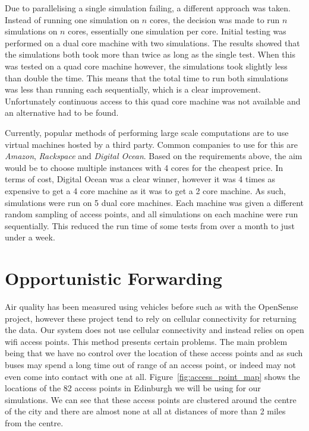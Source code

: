            Due to parallelising a single simulation failing, a different approach was taken. Instead of running one simulation on $n$ cores, the decision was made to run $n$ simulations on $n$ cores, essentially one simulation per core. Initial testing was performed on a dual core machine with two simulations. The results showed that the simulations both took more than twice as long as the single test. When this was tested on a quad core machine however, the simulations took slightly less than double the time. This means that the total time to run both simulations was less than running each sequentially, which is a clear improvement. Unfortunately continuous access to this quad core machine was not available and an alternative had to be found. 

            Currently, popular methods of performing large scale computations are to use virtual machines hosted by a third party. Common companies to use for this are \emph{Amazon}, \emph{Rackspace} and \emph{Digital Ocean}. Based on the requirements above, the aim would be to choose multiple instances with 4 cores for the cheapest price. In terms of cost, Digital Ocean was a clear winner, however it was 4 times as expensive to get a 4 core machine as it was to get a 2 core machine. As such, simulations were run on 5 dual core machines. Each machine was given a different random sampling of access points, and all simulations on each machine were run sequentially. This reduced the run time of some tests from over a month to just under a week. 


    \section{Opportunistic Forwarding}\label{simulation_opportunistic_forwarding}


        Air quality has been measured using vehicles before such as with the OpenSense project, however these project tend to rely on cellular connectivity for returning the data. Our system does not use cellular connectivity and instead relies on open wifi access points. This method presents certain problems. The main problem being that we have no control over the location of these access points and as such buses may spend a long time out of range of an access point, or indeed may not even come into contact with one at all. Figure~\ref{fig:access_point_map} shows the locations of the 82 access points in Edinburgh we will be using for our simulations. We can see that these access points are clustered around the centre of the city and there are almost none at all at distances of more than 2 miles from the centre. 

